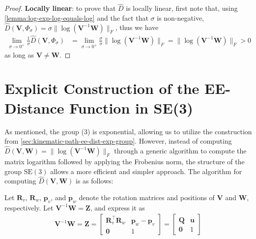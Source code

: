 \begin{proof}
    \textbf{Locally linear}: to prove that $\widehat{D}$ is locally linear, first note that, using \cref{lemma:log-exp-log-equals-log} and the fact that $\sigma$ is non-negative, $\widehat{D}(\mathbf{V}, \Phi_\sigma) = \sigma\|\log{\left(\mathbf{V}^{-1}\mathbf{W}\right)}\|_F$, thus we have
    \begin{align}
            \lim_{\sigma\to0^+}\frac{1}{\sigma}\widehat{D}(\mathbf{V}, \Phi_\sigma) &= \lim_{\sigma\to0^+}\frac{\sigma}{\sigma}\|\log{\left(\mathbf{V}^{-1}\mathbf{W}\right)}\|_F
            = \|\log{\left(\mathbf{V}^{-1}\mathbf{W}\right)}\|_F > 0
    \end{align}
    as long as $\mathbf{V} \not= \mathbf{W}$.
\end{proof}

\section{Explicit Construction of the EE-Distance Function in SE(3)}\label{sec:explicit-construction-SE3}
As mentioned, the group (3) is exponential, allowing us to utilize the construction from \cref{sec:kinematic-path-ee-dist-exp-group}. However, instead of computing $\widehat{D}(\mathbf{V},\mathbf{W}) = \|\log(\mathbf{V}^{-1}\mathbf{W})\|_F$ through a generic algorithm to compute the matrix logarithm followed by applying the Frobenius norm, the structure of the group $\text{SE}(3)$ allows a more efficient and simpler approach. The algorithm for computing $\widehat{D}(\mathbf{V},\mathbf{W})$ is as follows:

Let $\mathbf{R}_v$, $\mathbf{R}_w$, $\mathbf{p}_v$, and $\mathbf{p}_w$ denote the rotation matrices and positions of $\mathbf{V}$ and $\mathbf{W}$, respectively. Let $\mathbf{V}^{-1}\mathbf{W} = \mathbf{Z}$, and express it as 
\begin{align*}
    \mathbf{V}^{-1}\mathbf{W} = \mathbf{Z} =\begin{bmatrix}
        \mathbf{R}_v^\top\mathbf{R}_w & \mathbf{p}_w - \mathbf{p}_v \\
        \mathbf{0} & 1
    \end{bmatrix}
    = \begin{bmatrix}
        \mathbf{Q} & \mathbf{u} \\
        \mathbf{0} & 1
    \end{bmatrix}
\end{align*}

